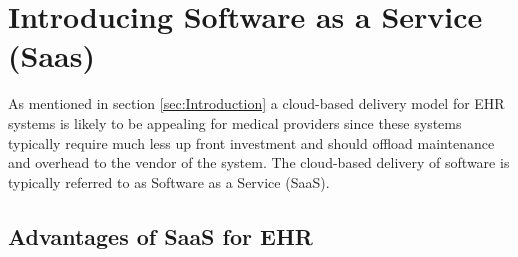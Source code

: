 \documentclass[10pt]{article}
\begin{document}

\section{Introducing Software as a Service (Saas)}
\label{sec:Intro_SaaS}

As mentioned in section \ref{sec:Introduction} a cloud-based delivery model for EHR systems is likely to be appealing for medical providers since these systems typically require much less up front investment and should offload maintenance and overhead to the vendor of the system.
The cloud-based delivery of software is typically referred to as Software as a Service (SaaS).

\subsection{Advantages of SaaS for EHR}
\label{sec:SaaS Adantages}
\end{document}
